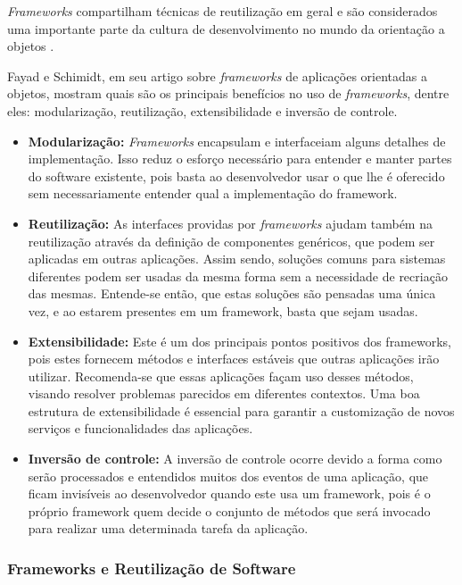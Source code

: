 \textit{Frameworks} compartilham técnicas de reutilização em geral e são considerados uma importante parte da cultura de desenvolvimento no mundo da orientação a objetos \cite{Johnson:1997}.

Fayad e Schimidt, em seu artigo \cite{Fayad:Schimidt:1997} sobre \textit{frameworks} de aplicações orientadas a objetos, mostram quais são os principais benefícios no uso de \textit{frameworks}, dentre eles: modularização, reutilização, extensibilidade e inversão de controle.

\begin{itemize}
	\item \textbf{Modularização:} \textit{Frameworks} encapsulam e interfaceiam alguns detalhes de implementação. Isso reduz o esforço necessário para entender e manter partes do software existente, pois basta ao desenvolvedor usar o que lhe é oferecido sem necessariamente entender qual a implementação do framework.

	\item \textbf{Reutilização:} As interfaces providas por \textit{frameworks} ajudam também na reutilização através da definição de componentes genéricos, que podem ser aplicadas em outras aplicações. Assim sendo, soluções comuns para sistemas diferentes podem ser usadas da mesma forma sem a necessidade de recriação das mesmas. Entende-se então, que estas soluções são pensadas uma única vez, e ao estarem presentes em um framework, basta que sejam usadas.

	\item \textbf{Extensibilidade:} Este é um dos principais pontos positivos dos frameworks, pois estes fornecem métodos e interfaces estáveis que outras aplicações irão utilizar. Recomenda-se que essas aplicações façam uso desses métodos, visando resolver problemas parecidos em diferentes contextos. Uma boa estrutura de extensibilidade é essencial para garantir a customização de novos serviços e funcionalidades das aplicações.

	\item \textbf{Inversão de controle:} A inversão de controle ocorre devido a forma como serão processados e entendidos muitos dos eventos de uma aplicação, que ficam invisíveis ao desenvolvedor quando este usa um framework, pois é o próprio framework quem decide o conjunto de métodos que será invocado para realizar uma determinada tarefa da aplicação.
\end{itemize}

\subsubsection{Frameworks e Reutilização de Software}

